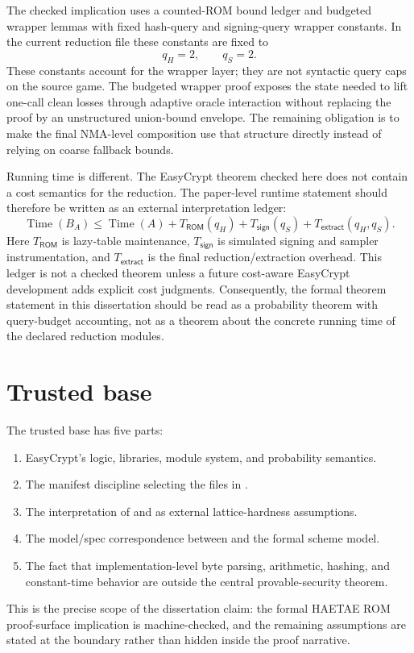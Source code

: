 The checked implication uses a counted-ROM bound ledger and budgeted wrapper
lemmas with fixed hash-query and signing-query wrapper constants.  In the
current reduction file these constants are fixed to
\[
  q_H=2,\qquad q_S=2.
\]
These constants account for the wrapper layer; they are not syntactic query caps
on the source  game.  The budgeted wrapper proof exposes
the state needed to lift one-call clean
losses through adaptive oracle interaction without replacing the proof by an
unstructured union-bound envelope.  The remaining obligation is to make the
final NMA-level composition use that structure directly instead of relying on
coarse fallback bounds.

Running time is different.  The EasyCrypt theorem checked here does not contain
a cost semantics for the reduction.  The paper-level runtime statement should
therefore be written as an external interpretation ledger:
\[
  \operatorname{Time}(B_A)
  \le
  \operatorname{Time}(A)
  +T_{\mathsf{ROM}}(q_H)
  +T_{\mathsf{sign}}(q_S)
  +T_{\mathsf{extract}}(q_H,q_S).
\]
Here \(T_{\mathsf{ROM}}\) is lazy-table maintenance, \(T_{\mathsf{sign}}\) is
simulated signing and sampler instrumentation, and \(T_{\mathsf{extract}}\) is
the final reduction/extraction overhead.  This ledger is not a checked theorem
unless a future cost-aware EasyCrypt development adds explicit cost judgments.
Consequently, the formal theorem statement in this dissertation should be read
as a probability theorem with query-budget accounting, not as a theorem about
the concrete running time of the declared reduction modules.

\section{Trusted base}
\label{sec:synthesis-trusted-base-final}

The trusted base has five parts:

\begin{enumerate}[label=\arabic*.]
\item EasyCrypt's logic, libraries, module system, and probability semantics.
\item The manifest discipline selecting the files in .
\item The interpretation of  and
 as external lattice-hardness assumptions.
\item The model/spec correspondence between  and the
formal scheme model.
\item The fact that implementation-level byte parsing, arithmetic, hashing, and
constant-time behavior are outside the central provable-security theorem.
\end{enumerate}

This is the precise scope of the dissertation claim: the formal HAETAE ROM
proof-surface implication is machine-checked, and the remaining assumptions are
stated at the boundary rather than hidden inside the proof narrative.
